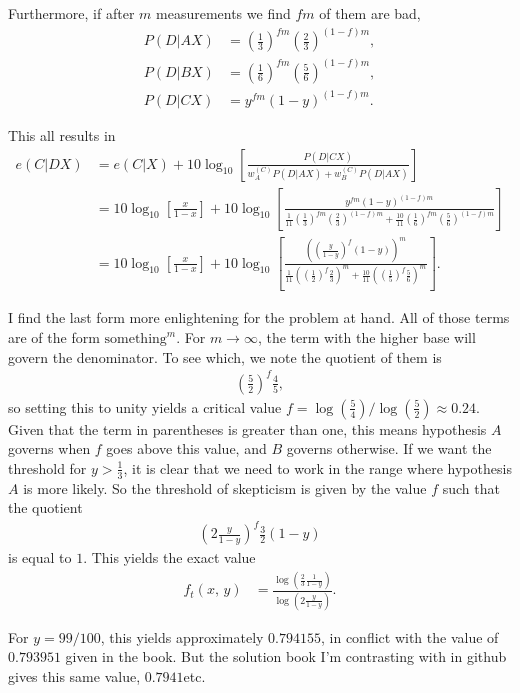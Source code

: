 \documentclass{article}
\begin{document}
Furthermore, if after $m$ measurements we find $fm$ of them are bad,
\begin{align*}
	P(D|AX)&=\left(\frac13\right)^{fm}\left(\frac23\right)^{(1-f)m},\\
	P(D|BX)&=\left(\frac16\right)^{fm}\left(\frac56\right)^{(1-f)m},\\
	P(D|CX)&=y^{fm}(1-y)^{(1-f)m}.
\end{align*}

This all results in
\begin{align*}
	e(C|DX)&=e(C|X)+10\log_{10}\left[\frac{P(D|CX)}{w_A^{(C)}P(D|AX)+w_B^{(C)}P(D|AX)}\right]\\
	&=10\log_{10}\left[\frac{x}{1-x}\right]+10\log_{10}\left[\frac{y^{fm}(1-y)^{(1-f)m}}{\frac1{11}\left(\frac13\right)^{fm}\left(\frac23\right)^{(1-f)m}+\frac{10}{11}\left(\frac16\right)^{fm}\left(\frac56\right)^{(1-f)m}}\right]\\
	&=10\log_{10}\left[\frac{x}{1-x}\right]+10\log_{10}\left[\frac{\left(\left(\frac{y}{1-y}\right)^f(1-y)\right)^m}{\frac1{11}\left(\left(\frac12\right)^f\frac23\right)^m+\frac{10}{11}\left(\left(\frac15\right)^f\frac56\right)^m}\right].
\end{align*}

I find the last form more enlightening for the problem at hand. All of those terms are of the form $\text{something}^m$. For $m\rightarrow\infty$, the term with the higher base will govern the denominator. To see which, we note the quotient of them is
\begin{align*}
	\left(\frac52\right)^f\frac45,
\end{align*}
so setting this to unity yields a critical value $f=\log\left(\frac54\right)/\log\left(\frac52\right)\approx0.24$. Given that the term in parentheses is greater than one, this means hypothesis $A$ governs when $f$ goes above this value, and $B$ governs otherwise. If we want the threshold for $y>\frac13$, it is clear that we need to work in the range where hypothesis $A$ is more likely. So the threshold of skepticism is given by the value $f$ such that the quotient
\begin{align*}
	\left(2\frac{y}{1-y}\right)^f\frac32(1-y)
\end{align*}
is equal to $1$. This yields the exact value
\begin{align*}
	f_t(x,\,y)&=\frac{\log\left(\frac23\frac1{1-y}\right)}{\log\left(2\frac{y}{1-y}\right)}.
\end{align*}

For $y=99/100$, this yields approximately $0.794155$, in conflict with the value of $0.793951$ given in the book. But the solution book I'm contrasting with in github gives this same value, $0.7941$etc.
\end{document}
